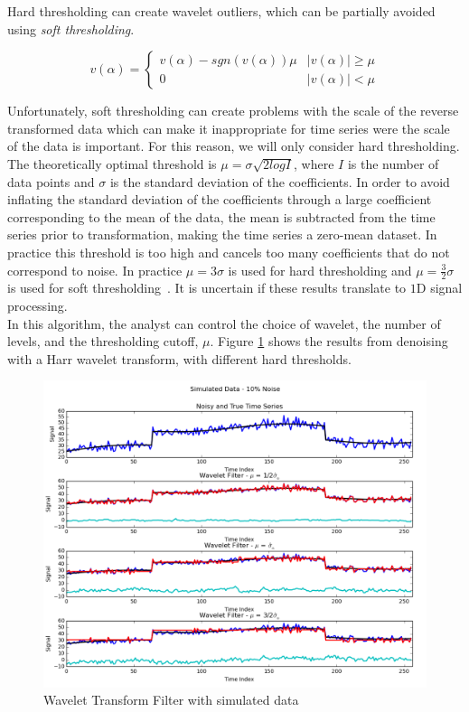 \documentclass[11pt]{article}
\theoremstyle{definition}
\begin{document}
Hard thresholding can create wavelet outliers, which can be partially avoided using \textit{soft thresholding}.

\begin{displaymath}
v\left(\alpha\right) = 
\begin{cases}
v\left(\alpha\right) - sgn\left(v\left(\alpha\right)\right)\mu & \lvert v\left(\alpha\right)\rvert \geq \mu \\
0 & \lvert v\left(\alpha\right)\rvert < \mu
\end{cases}
\end{displaymath}

Unfortunately, soft thresholding can create problems with the scale of the reverse transformed data which can make it inappropriate for time series were the scale of the data is important. For this reason, we will only consider hard thresholding.\\

The theoretically optimal threshold is $\mu = \sigma \sqrt{2 log I}$, where $I$ is the number of data points and $\sigma$ is the standard deviation of the coefficients. In order to avoid inflating the standard deviation of the coefficients through a large coefficient corresponding to the mean of the data, the mean is subtracted from the time series prior to transformation, making the time series a zero-mean dataset. In practice this threshold is too high and cancels too many coefficients that do not correspond to noise. In practice $\mu = 3 \sigma$ is used for hard thresholding and $\mu = \frac{3}{2} \sigma$ is used for soft thresholding~\cite{Buades05}. It is uncertain if these results translate to $1$D signal processing.\\

In this algorithm, the analyst can control the choice of wavelet, the number of levels, and the thresholding cutoff, $\mu$. Figure \ref{waveletcompare} shows the results from denoising with a Harr wavelet transform, with different hard thresholds.\\

\begin{figure}
\centering
\includegraphics[width = 0.75 \textwidth]{WaveletCompare.png}
\caption{Wavelet Transform Filter with simulated data}
\label{waveletcompare}
\end{figure}
\end{document}
